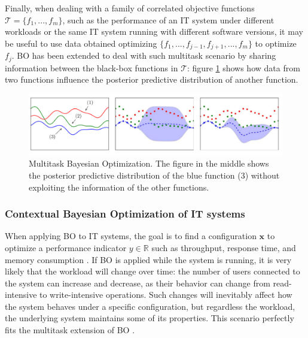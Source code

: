 \documentclass[a4paper, 12pt]{article} %
\begin{document}
	Finally, when dealing with a family of correlated objective functions $\mathcal{T}=\{f_1, ..., f_m\}$, such as the performance of an IT system under different workloads or the same IT system running with different software versions, it may be useful to use data obtained optimizing $\{f_1, ..., f_{j-1}, f_{j+1}, ..., f_m\}$ to optimize $f_j$. BO has been extended to deal with such multitask scenario \cite{CGPBanditOptimization} by sharing information between the black-box functions in $\mathcal{T}$: figure \ref{fig:multitask_bo} shows how data from two functions influence the posterior predictive distribution of another function.
	\begin{figure} \label{fig:multitask_bo}
		\includegraphics[width=\linewidth]{img/multitask_bo.png}
		\caption{Multitask Bayesian Optimization. The figure in the middle shows the posterior predictive distribution of the blue function (3) without exploiting the information of the other functions.}
	\end{figure}
	
	\subsubsection{Contextual Bayesian Optimization of IT systems} \label{ssec:contextual_bayesian_optimization}
	
	When applying BO to IT systems, the goal is to find a configuration $\pmb{x}$ to optimize a performance indicator $y \in \mathbb{R}$ such as throughput, response time, and memory consumption \cite{AkamasCGP}. If BO is applied while the system is running, it is very likely that the workload will change over time: the number of users connected to the system can increase and decrease, as their behavior can change from read-intensive to write-intensive operations. Such changes will inevitably affect how the system behaves under a specific configuration, but regardless the workload, the underlying system maintains some of its properties. This scenario perfectly fits the multitask extension of BO \cite{CGPBanditOptimization}.
	
\end{document}
